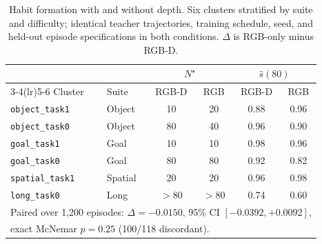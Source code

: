 \begin{table}[t]
\caption{Habit formation with and without depth. Six clusters stratified by suite and
difficulty; identical teacher trajectories, training schedule, seed, and held-out
episode specifications in both conditions. $\Delta$ is RGB-only minus RGB-D.}
\label{tab:depth_ablation}
\centering\small
\begin{tabular}{llcccc}
\toprule
& & \multicolumn{2}{c}{$N^{\star}$} & \multicolumn{2}{c}{$\hat{s}(80)$} \\
\cmidrule(lr){3-4}\cmidrule(lr){5-6}
Cluster & Suite & RGB-D & RGB & RGB-D & RGB \\
\midrule
\texttt{object\_task1} & Object & 10 & 20 & 0.88 & 0.96 \\
\texttt{object\_task0} & Object & 80 & 40 & 0.96 & 0.90 \\
\texttt{goal\_task1} & Goal & 10 & 10 & 0.98 & 0.96 \\
\texttt{goal\_task0} & Goal & 80 & 80 & 0.92 & 0.82 \\
\texttt{spatial\_task1} & Spatial & 20 & 20 & 0.96 & 0.98 \\
\texttt{long\_task0} & Long & $>$80 & $>$80 & 0.74 & 0.60 \\
\midrule
\multicolumn{6}{l}{\footnotesize Paired over 1,200 episodes: $\Delta = -0.0150$, 95\% CI $[-0.0392, +0.0092]$,} \\
\multicolumn{6}{l}{\footnotesize exact McNemar $p = 0.25$ (100/118 discordant).} \\
\bottomrule
\end{tabular}
\end{table}
